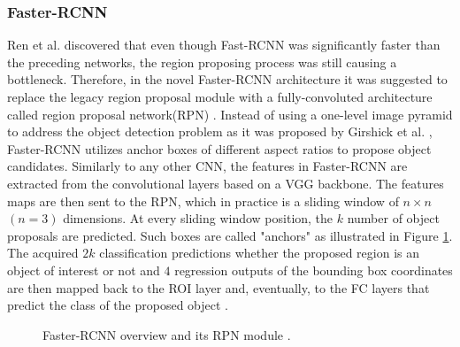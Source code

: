 \subsubsection{Faster-RCNN} 
Ren et al. \cite{ima} discovered that even though Fast-RCNN was significantly faster than the preceding networks, the region proposing process was still causing a bottleneck. Therefore, in the novel Faster-RCNN \cite{ima} architecture it was suggested to replace the legacy region proposal module with a fully-convoluted architecture called region proposal network(RPN) \cite{Girshick2013}. Instead of using a one-level image pyramid to address the object detection problem as it was proposed by Girshick et al. \cite{Girshick2015}, Faster-RCNN utilizes anchor boxes of different aspect ratios to propose object candidates. Similarly to any other CNN, the features in Faster-RCNN are extracted from the convolutional layers based on a VGG backbone. The features maps are then sent to the RPN, which in practice is a sliding window  of $n\times n$ $(n=3)$ dimensions. At every sliding window position, the $k$ number of object proposals are predicted. Such boxes are called "anchors" as illustrated in Figure \ref{fig:faster_rcnn}. The acquired $2k$ classification predictions whether the proposed region is an object of interest or not and $4$ regression outputs of the bounding box coordinates are then mapped back to the ROI layer and, eventually, to the FC layers that predict the class of the proposed object \cite{ima}. 


\begin{figure}[htb]
    \centering
    \qquad
    \caption{Faster-RCNN overview and its RPN module \cite{ima}.}
    \label{fig:faster_rcnn}%
\end{figure}

